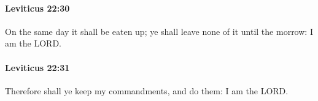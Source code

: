 		\paragraph{Leviticus 22:30} %
			\label{LEVITICUS-22-30}

			On the same day it shall be eaten up; ye shall leave none of it until the morrow: I am the LORD.


		\paragraph{Leviticus 22:31} %
			\label{LEVITICUS-22-31}

			Therefore shall ye keep my commandments, and do them: I am the LORD.


